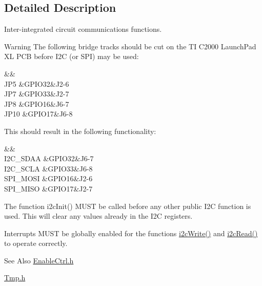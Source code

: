 \subsection{Detailed Description}
Inter-\/integrated circuit communications functions. \begin{DoxyWarning}{Warning}
The following bridge tracks should be cut on the T\-I C2000 Launch\-Pad X\-L P\-C\-B before I2\-C (or S\-P\-I) may be used\-: \begin{TabularC}{3}
\hline
{}\PBS{}&\PBS{}&\PBS{}\\
\PBS\centering J\-P5 &\PBS\centering G\-P\-I\-O32&\PBS\centering J2-\/6 \\
\PBS\centering J\-P7 &\PBS\centering G\-P\-I\-O33&\PBS\centering J2-\/7 \\
\PBS\centering J\-P8 &\PBS\centering G\-P\-I\-O16&\PBS\centering J6-\/7 \\
\PBS\centering J\-P10 &\PBS\centering G\-P\-I\-O17&\PBS\centering J6-\/8 \\
\end{TabularC}
This should result in the following functionality\-: \begin{TabularC}{3}
\hline
{}\PBS{}&\PBS{}&\PBS{}\\
\PBS\centering I2\-C\-\_\-\-S\-D\-A\-A &\PBS\centering G\-P\-I\-O32&\PBS\centering J6-\/7 \\
\PBS\centering I2\-C\-\_\-\-S\-C\-L\-A &\PBS\centering G\-P\-I\-O33&\PBS\centering J6-\/8 \\
\PBS\centering S\-P\-I\-\_\-\-M\-O\-S\-I &\PBS\centering G\-P\-I\-O16&\PBS\centering J2-\/6 \\
\PBS\centering S\-P\-I\-\_\-\-M\-I\-S\-O &\PBS\centering G\-P\-I\-O17&\PBS\centering J2-\/7 \\
\end{TabularC}


The function i2c\-Init() M\-U\-S\-T be called before any other public I2\-C function is used. This will clear any values already in the I2\-C registers.

Interrupts M\-U\-S\-T be globally enabled for the functions \hyperlink{a00025_a3813bb8cae6159f7df2672a55be4014b}{i2c\-Write()} and \hyperlink{a00025_aa681ec1b6413dd7009a6aaf0df2cbac1}{i2c\-Read()} to operate correctly.
\end{DoxyWarning}
\begin{DoxySeeAlso}{See Also}
\hyperlink{a00023}{Enable\-Ctrl.\-h} 

\hyperlink{a00058}{Tmp.\-h} 
\end{DoxySeeAlso}


